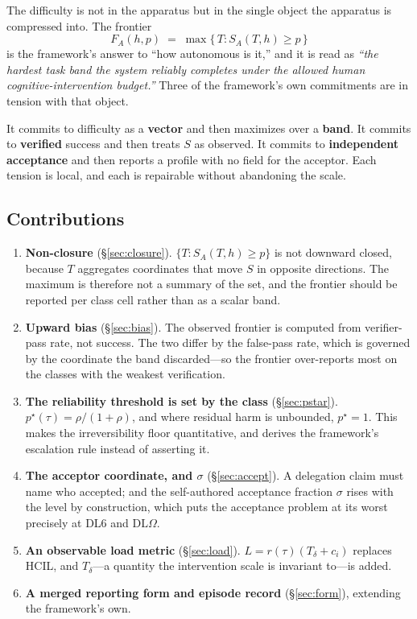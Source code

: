 \documentclass[11pt]{article}
\theoremstyle{definition}
\newcommand{\Td}{\ensuremath{T_\delta}}
\newcommand{\pstar}{\ensuremath{p^{\star}}}
\newcommand{\DLO}{\ensuremath{\mathrm{DL}\Omega}}
\begin{document}
The difficulty is not in the apparatus but in the single object the apparatus is compressed into. The frontier
\begin{equation}
F_A(h,p) \;=\; \max\{\, T : S_A(T,h) \ge p \,\}
\label{eq:frontier}
\end{equation}
is the framework's answer to ``how autonomous is it,'' and it is read as \emph{``the hardest task band the system reliably completes under the allowed human cognitive-intervention budget.''} Three of the framework's own commitments are in tension with that object.

It commits to difficulty as a \textbf{vector} and then maximizes over a \textbf{band}. It commits to \textbf{verified} success and then treats $S$ as observed. It commits to \textbf{independent acceptance} and then reports a profile with no field for the acceptor. Each tension is local, and each is repairable without abandoning the scale.

\subsection{Contributions}

\begin{enumerate}
\item \textbf{Non-closure} (\S\ref{sec:closure}). $\{T:S_A(T,h)\ge p\}$ is not downward closed, because $T$ aggregates coordinates that move $S$ in opposite directions. The maximum is therefore not a summary of the set, and the frontier should be reported per class cell rather than as a scalar band.
\item \textbf{Upward bias} (\S\ref{sec:bias}). The observed frontier is computed from verifier-pass rate, not success. The two differ by the false-pass rate, which is governed by the coordinate the band discarded---so the frontier over-reports most on the classes with the weakest verification.
\item \textbf{The reliability threshold is set by the class} (\S\ref{sec:pstar}). $\pstar(\tau)=\rho/(1+\rho)$, and where residual harm is unbounded, $\pstar=1$. This makes the irreversibility floor quantitative, and derives the framework's escalation rule instead of asserting it.
\item \textbf{The acceptor coordinate, and $\sigma$} (\S\ref{sec:accept}). A delegation claim must name who accepted; and the self-authored acceptance fraction $\sigma$ rises with the level by construction, which puts the acceptance problem at its worst precisely at DL6 and \DLO{}.
\item \textbf{An observable load metric} (\S\ref{sec:load}). $L=r(\tau)(\Td+c_i)$ replaces HCIL, and \Td{}---a quantity the intervention scale is invariant to---is added.
\item \textbf{A merged reporting form and episode record} (\S\ref{sec:form}), extending the framework's own.
\end{enumerate}
\end{document}
